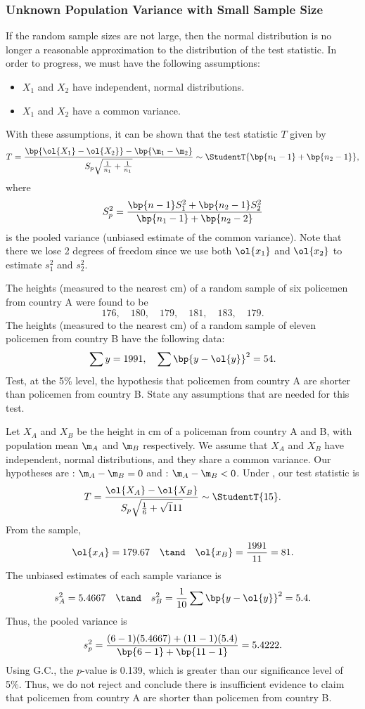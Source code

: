 \subsubsection{Unknown Population Variance with Small Sample Size}

If the random sample sizes are not large, then the normal distribution is no longer a reasonable approximation to the distribution of the test statistic. In order to progress, we must have the following assumptions:
\begin{itemize}
    \item $X_1$ and $X_2$ have independent, normal distributions.
    \item $X_1$ and $X_2$ have a common variance.
\end{itemize}
With these assumptions, it can be shown that the test statistic $T$ given by \[T = \frac{\bp{\ol{X_1} - \ol{X_2}} - \bp{\m_1 - \m_2}}{S_p \sqrt{\frac1{n_1} + \frac1{n_1}}} \sim \StudentT{\bp{n_1 - 1} + \bp{n_2 - 1}},\] where \[S^2_p = \frac{\bp{n-1} S_1^2 + \bp{n_2 - 1} S_2^2}{\bp{n_1 - 1} + \bp{n_2 - 2}}\] is the pooled variance (unbiased estimate of the common variance). Note that there we lose 2 degrees of freedom since we use both $\ol{x_1}$ and $\ol{x_2}$ to estimate $s_1^2$ and $s_2^2$.

\begin{sample}
    The heights (measured to the nearest cm) of a random sample of six policemen from country A were found to be \[176, \quad 180, \quad 179, \quad 181, \quad 183, \quad 179.\] The heights (measured to the nearest cm) of a random sample of eleven policemen from country B have the following data: \[\sum y = 1991, \quad \sum \bp{y - \ol{y}}^2 = 54.\] Test, at the 5\% level, the hypothesis that policemen from country A are shorter than policemen from country B. State any assumptions that are needed for this test.
\end{sample}
\begin{sampans}
    Let $X_A$ and $X_B$ be the height in cm of a policeman from country A and B, with population mean $\m_A$ and $\m_B$ respectively. We assume that $X_A$ and $X_B$ have independent, normal distributions, and they share a common variance. Our hypotheses are \nullhyp: $\m_A - \m_B = 0$ and \althyp: $\m_A - \m_B < 0$. Under \nullhyp, our test statistic is \[T = \frac{\ol{X_A} - \ol{X_B}}{S_p \sqrt{\frac16 + \sqrt1{11}}} \sim \StudentT{15}.\] From the sample, \[\ol{x_A} = 179.67 \quad \tand \quad \ol{x_B} = \frac{1991}{11} = 81.\] The unbiased estimates of each sample variance is \[s_A^2 = 5.4667 \quad \tand \quad s_B^2 = \frac1{10} \sum \bp{y - \ol{y}}^2 = 5.4.\] Thus, the pooled variance is \[s_p^2 = \frac{(6-1)(5.4667) + (11-1)(5.4)}{\bp{6-1} + \bp{11-1}} = 5.4222.\] Using G.C., the $p$-value is 0.139, which is greater than our significance level of 5\%. Thus, we do not reject \nullhyp{} and conclude there is insufficient evidence to claim that policemen from country A are shorter than policemen from country B.
\end{sampans}

